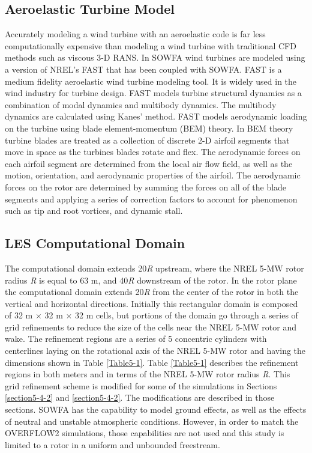\subsection{Aeroelastic Turbine Model}\label{section5-2-3}
Accurately modeling a wind turbine with an aeroelastic code is far less computationally expensive than modeling a wind turbine with traditional CFD methods such as viscous 3-D RANS. In SOWFA wind turbines are modeled using a version of NREL's FAST that has been coupled with SOWFA. FAST is a medium fidelity aeroelastic wind turbine modeling tool.  It is widely used in the wind industry for turbine design. FAST models turbine structural dynamics as a combination of modal dynamics and multibody dynamics. The multibody dynamics are calculated using Kanes' method.\cite{jonkman2013}  FAST models aerodynamic loading on the turbine using blade element-momentum (BEM) theory. In BEM theory turbine blades are treated as  a collection of discrete 2-D airfoil segments that move in space as the turbines blades rotate and flex. The aerodynamic forces on each airfoil segment are determined from the local air flow field, as well as the motion, orientation, and aerodynamic properties of the airfoil.  The aerodynamic forces on the rotor are determined by summing the forces on all of the blade segments and applying a series of correction factors to account for phenomenon such as tip and root vortices, and dynamic stall.\cite{burton2011} 


\subsection{LES Computational Domain}\label{section5-2-4}
The computational domain extends 20\emph{R} upstream, where the NREL 5-MW rotor radius \emph{R} is equal to 63 m, and 40\emph{R} downstream of the rotor. In the rotor plane the computational domain extends 20\emph{R} from the center of the rotor in both the vertical and horizontal directions. Initially this rectangular domain is composed of 32 m $\times$ 32 m $\times$ 32 m cells, but portions of the domain go through a series of grid refinements to reduce the size of the cells near the NREL 5-MW rotor and wake. The refinement regions are a series of 5 concentric cylinders with centerlines laying on the rotational axis of the NREL 5-MW rotor and having the dimensions shown in Table \ref{Table5-1}. Table \ref{Table5-1} describes the refinement regions in both meters and in terms of the NREL 5-MW rotor radius \emph{R}. This grid refinement scheme is modified for some of the simulations in Sections \ref{section5-4-2} and \ref{section5-4-2}. The modifications are described in those sections.  SOWFA has the capability to model ground effects, as well as the effects of neutral and unstable atmospheric conditions. However, in order to match the OVERFLOW2 simulations, those capabilities are not used and this study is limited to a rotor in a uniform and unbounded freestream.

